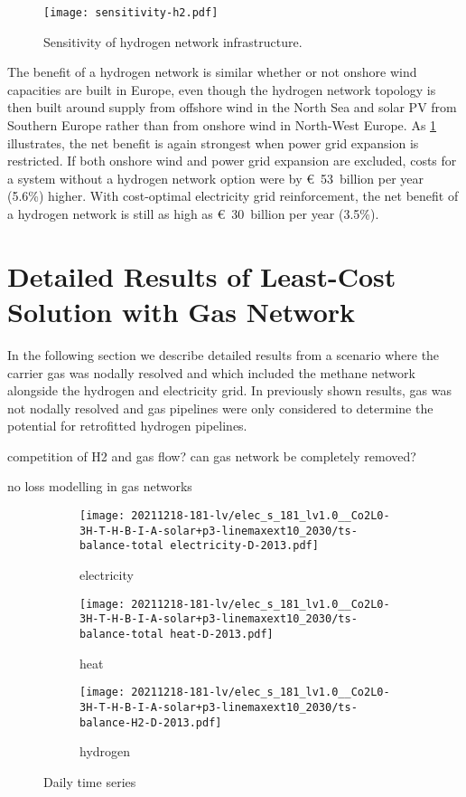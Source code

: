 \begin{figure}
    \centering
    \texttt{[image: sensitivity-h2.pdf]}
    \caption{Sensitivity of hydrogen network infrastructure.}
    \label{fig:h2-restriction-w-onw}
\end{figure}

The benefit of a hydrogen network is similar whether or not onshore wind
capacities are built in Europe, even though the hydrogen network topology is
then built around supply from offshore wind in the North Sea and solar PV from
Southern Europe rather than from onshore wind in North-West Europe. As
\cref{fig:h2-restriction-w-onw} illustrates, the net benefit is again strongest
when power grid expansion is restricted. If both onshore wind and power grid
expansion are excluded, costs for a system without a hydrogen network option
were by \euro~53~billion per year (5.6\%) higher. With cost-optimal electricity
grid reinforcement, the net benefit of a hydrogen network is still as high as
\euro~30~billion per year (3.5\%).

\section{Detailed Results of Least-Cost Solution with Gas Network}
\label{sec:si:detailed}

In the following section we describe detailed results from a scenario where the
carrier gas was nodally resolved and which included the methane network
alongside the hydrogen and electricity grid. In previously shown results, gas
was not nodally resolved and gas pipelines were only considered to determine the
potential for retrofitted hydrogen pipelines.

competition of H2 and gas flow? can gas network be completely removed?

no loss modelling in gas networks

\begin{figure}
    \centering
    \begin{subfigure}[t]{\textwidth}
        \centering
        \caption{electricity}
        \texttt{[image: 20211218-181-lv/elec\_s\_181\_lv1.0\_\_Co2L0-3H-T-H-B-I-A-solar+p3-linemaxext10\_2030/ts-balance-total electricity-D-2013.pdf]}
    \end{subfigure}
    \begin{subfigure}[t]{\textwidth}
        \centering
        \caption{heat}
        \texttt{[image: 20211218-181-lv/elec\_s\_181\_lv1.0\_\_Co2L0-3H-T-H-B-I-A-solar+p3-linemaxext10\_2030/ts-balance-total heat-D-2013.pdf]}
    \end{subfigure}
    \begin{subfigure}[t]{\textwidth}
        \centering
        \caption{hydrogen}
        \texttt{[image: 20211218-181-lv/elec\_s\_181\_lv1.0\_\_Co2L0-3H-T-H-B-I-A-solar+p3-linemaxext10\_2030/ts-balance-H2-D-2013.pdf]}
    \end{subfigure}
    \caption{Daily time series}
    \label{fig:output-ts-1}
\end{figure}

